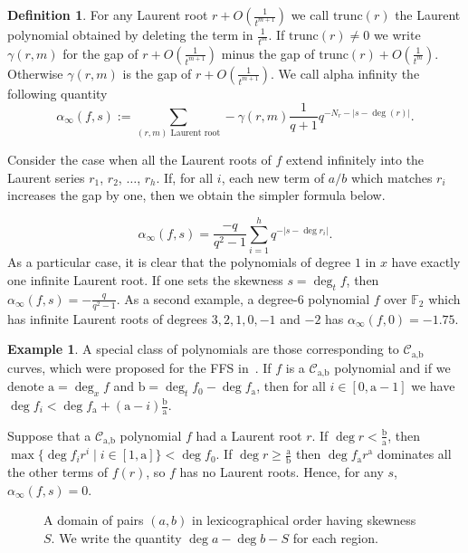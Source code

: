 \documentclass[a4wide]{article}
\newcommand{\F}{{\mathbb F}}
\theoremstyle{plain}
\theoremstyle{definition}
\newtheorem{deff}[theo]{Definition}
\newtheorem{ex}[theo]{Example}
\theoremstyle{remark}
\begin{document}
\begin{deff}
    For any Laurent root $r+O(\frac{1}{t^{m+1}})$ we call
    $\mathrm{trunc}(r)$ the
	Laurent polynomial obtained by deleting the term in $\frac{1}{t^m}$.
        If $\mathrm{trunc}(r)\neq 0$ we write $\gamma(r,m)$ for the gap of
        $r+O(\frac{1}{t^{m+1}})$ minus the gap of $\mathrm{trunc}(r)+O(\frac{1}{t^m})$.
	Otherwise $\gamma(r,m)$ is the gap of $r+O(\frac{1}{t^{m+1}})$. We
	call alpha infinity the following quantity
	\begin{equation}\label{alpha_infty}
		\alpha_\infty(f,s):=\sum_{(r,m)\text{ Laurent
		root}} -\gamma(r,m)\frac{1}{q+1} q^{-N_r-|s-\deg(r)|}.
\end{equation}
\end{deff}

Consider the case when all the Laurent roots of $f$ extend infinitely into the
Laurent series $r_1$, $r_2$, $\ldots$, $r_h$. If, for all $i$, each new term
of $a/b$ which matches $r_i$ increases the gap by one, then we obtain the simpler formula below.

	\begin{equation}
		\alpha_\infty(f,s)=\frac{-q}{q^2-1}\sum_{i=1}^h q^{-|s-\deg r_i|}.
	\end{equation}
As a particular case, it is clear that the polynomials of degree $1$
 in $x$ have exactly one infinite Laurent root. If one sets the skewness
 $s=\deg_t f$, then $\alpha_\infty(f,s)=-\frac{q}{q^2-1}$. As a second
 example, a degree-$6$ polynomial $f$ over $\F_2$ which has infinite Laurent
 roots of degrees $3,2,1,0,-1$ and $-2$ has
 $\alpha_\infty(f,0)=-1.75$. 
 \begin{ex} 
	 A special class of polynomials are those corresponding to
	 $\mathcal{C}_{\text{a},\text{b}}$ curves, which were proposed
         for the FFS in~\cite{Mat99}. If $f$ is a
	 $\mathcal{C}_{\text{a},\text{b}}$ polynomial and if we denote
	 $\text{a}=\deg_x f$ and
	 $\text{b}=\deg_t f_0-\deg f_\text{a}$, then 
	 for all $i\in[0,\text{a}-1]$ we have $\deg f_i<
	 \deg f_\text{a} +(\text{a}-i)\frac{\text{b}}{\text{a}}$. 
	 
	 Suppose that a $\mathcal{C}_{\text{a},\text{b}}$ polynomial $f$ had a Laurent
	 root $r$. If $\deg r<\frac{\text{b}}{\text{a}}$, then $\max \{\deg f_i r^i\mid
	 i\in[1,\text{a}]\}< \deg f_0$. If
	 $\deg r\geq \frac{\text{a}}{\text{b}}$ then $\deg
	 f_\text{a} r^\text{a}$ dominates all the
	 other terms of $f(r)$, so $f$ has no Laurent roots. Hence, for any
	 $s$, $\alpha_\infty(f,s)=0$. 
\end{ex}
\begin{figure}[ht!]
\caption{A domain of pairs $(a,b)$ in lexicographical order having skewness
$S$. We write the quantity $\deg a -\deg b -S$ for each region.}
\label{skewness}
\begin{center}

\end{center}
\end{figure}
\end{document}
